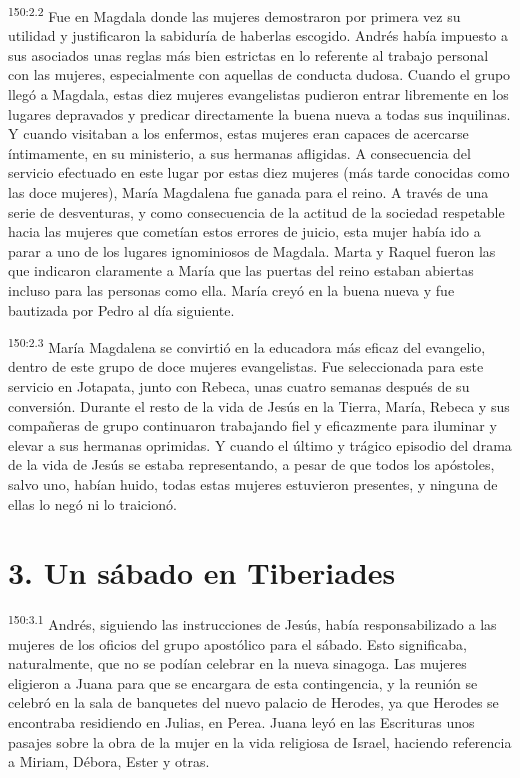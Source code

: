 \par 
\textsuperscript{150:2.2} Fue en Magdala donde las mujeres demostraron por primera vez su utilidad y justificaron la sabiduría de haberlas escogido. Andrés había impuesto a sus asociados unas reglas más bien estrictas en lo referente al trabajo personal con las mujeres, especialmente con aquellas de conducta dudosa. Cuando el grupo llegó a Magdala, estas diez mujeres evangelistas pudieron entrar libremente en los lugares depravados y predicar directamente la buena nueva a todas sus inquilinas. Y cuando visitaban a los enfermos, estas mujeres eran capaces de acercarse íntimamente, en su ministerio, a sus hermanas afligidas. A consecuencia del servicio efectuado en este lugar por estas diez mujeres (más tarde conocidas como las doce mujeres), María Magdalena fue ganada para el reino. A través de una serie de desventuras, y como consecuencia de la actitud de la sociedad respetable hacia las mujeres que cometían estos errores de juicio, esta mujer había ido a parar a uno de los lugares ignominiosos de Magdala. Marta y Raquel fueron las que indicaron claramente a María que las puertas del reino estaban abiertas incluso para las personas como ella. María creyó en la buena nueva y fue bautizada por Pedro al día siguiente.

\par 
\textsuperscript{150:2.3} María Magdalena se convirtió en la educadora más eficaz del evangelio, dentro de este grupo de doce mujeres evangelistas. Fue seleccionada para este servicio en Jotapata, junto con Rebeca, unas cuatro semanas después de su conversión. Durante el resto de la vida de Jesús en la Tierra, María, Rebeca y sus compañeras de grupo continuaron trabajando fiel y eficazmente para iluminar y elevar a sus hermanas oprimidas. Y cuando el último y trágico episodio del drama de la vida de Jesús se estaba representando, a pesar de que todos los apóstoles, salvo uno, habían huido, todas estas mujeres estuvieron presentes, y ninguna de ellas lo negó ni lo traicionó.

\section*{3. Un sábado en Tiberiades}
\par 
\textsuperscript{150:3.1} Andrés, siguiendo las instrucciones de Jesús, había responsabilizado a las mujeres de los oficios del grupo apostólico para el sábado. Esto significaba, naturalmente, que no se podían celebrar en la nueva sinagoga. Las mujeres eligieron a Juana para que se encargara de esta contingencia, y la reunión se celebró en la sala de banquetes del nuevo palacio de Herodes, ya que Herodes se encontraba residiendo en Julias, en Perea. Juana leyó en las Escrituras unos pasajes sobre la obra de la mujer en la vida religiosa de Israel, haciendo referencia a Miriam, Débora, Ester y otras.

